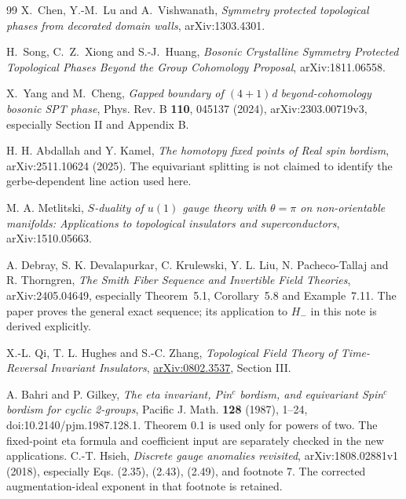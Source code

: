 \begin{thebibliography}{99}
 X.~Chen, Y.-M.~Lu and A.~Vishwanath, \emph{Symmetry protected topological phases from decorated domain walls}, arXiv:1303.4301.

 H.~Song, C.~Z.~Xiong and S.-J.~Huang, \emph{Bosonic Crystalline Symmetry Protected Topological Phases Beyond the Group Cohomology Proposal}, arXiv:1811.06558.

 X.~Yang and M.~Cheng, \emph{Gapped boundary of $(4+1)$d beyond-cohomology bosonic SPT phase}, Phys. Rev. B \textbf{110}, 045137 (2024), arXiv:2303.00719v3, especially Section II and Appendix B.

 H. H. Abdallah and Y. Kamel, \emph{The homotopy fixed points of Real spin bordism}, arXiv:2511.10624 (2025). The equivariant splitting is not claimed to identify the gerbe-dependent line action used here.

 M. A. Metlitski, \emph{$S$-duality of $u(1)$ gauge theory with $\theta=\pi$ on non-orientable manifolds: Applications to topological insulators and superconductors}, arXiv:1510.05663.

 A. Debray, S. K. Devalapurkar, C. Krulewski, Y. L. Liu, N. Pacheco-Tallaj and R. Thorngren, \emph{The Smith Fiber Sequence and Invertible Field Theories}, arXiv:2405.04649, especially Theorem~5.1, Corollary~5.8 and Example~7.11. The paper proves the general exact sequence; its application to $H_-$ in this note is derived explicitly.

 X.-L. Qi, T. L. Hughes and S.-C. Zhang,
\emph{Topological Field Theory of Time-Reversal Invariant Insulators},
\href{https://arxiv.org/abs/0802.3537}{arXiv:0802.3537}, Section III.

 A. Bahri and P. Gilkey, \emph{The eta invariant, Pin$^c$ bordism, and equivariant Spin$^c$ bordism for cyclic 2-groups}, Pacific J. Math. \textbf{128} (1987), 1--24, doi:10.2140/pjm.1987.128.1. Theorem 0.1 is used only for powers of two. The fixed-point eta formula and coefficient input are separately checked in the new applications.
 C.-T. Hsieh, \emph{Discrete gauge anomalies revisited}, arXiv:1808.02881v1 (2018), especially Eqs. (2.35), (2.43), (2.49), and footnote 7. The corrected augmentation-ideal exponent in that footnote is retained.

\end{thebibliography}
